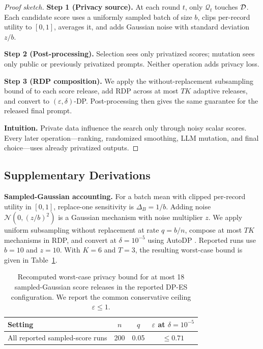 \begin{proof}[Proof sketch]
\textbf{Step 1 (Privacy source).} At each round $t$, only $\mathcal{Q}_t$ touches $\mathcal{D}$. Each candidate score uses a uniformly sampled batch of size $b$, clips per-record utility to $[0,1]$, averages it, and adds Gaussian noise with standard deviation $z/b$.

\noindent \textbf{Step 2 (Post-processing).} Selection sees only privatized scores; mutation sees only public or previously privatized prompts. Neither operation adds privacy loss.

\noindent \textbf{Step 3 (RDP composition).} We apply the without-replacement subsampling bound of \citet{wang2019subsampled} to each score release, add RDP across at most $TK$ adaptive releases, and convert to $(\varepsilon,\delta)$-DP. Post-processing then gives the same guarantee for the released final prompt.

\textbf{Intuition.} Private data influence the search only through noisy scalar scores. Every later operation---ranking, randomized smoothing, LLM mutation, and final choice---uses already privatized outputs.
\end{proof}

\subsection{Supplementary Derivations}
\label{sec:appendix:derivations}

\noindent\textbf{Sampled-Gaussian accounting.}
For a batch mean with clipped per-record utility in $[0,1]$, replace-one sensitivity is $\Delta_B=1/b$. Adding noise $\mathcal{N}(0,(z/b)^2)$ is a Gaussian mechanism with noise multiplier $z$. We apply uniform subsampling without replacement at rate $q=b/n$, compose at most $TK$ mechanisms in RDP, and convert at $\delta=10^{-5}$ using AutoDP \cite{autodp}. Reported runs use $b=10$ and $z=10$. With $K=6$ and $T=3$, the resulting worst-case bound is given in Table~\ref{tab:rdp_bounds}.

\begin{table}[t]
\centering
\small
\begin{tabular}{lccc}
\toprule
\textbf{Setting} & $n$ & $q$ & $\varepsilon$ at $\delta=10^{-5}$ \\
\midrule
All reported sampled-score runs & 200 & 0.05 & $\leq0.71$ \\
\bottomrule
\end{tabular}
\caption{Recomputed worst-case privacy bound for at most 18 sampled-Gaussian score releases in the reported DP-ES configuration. We report the common conservative ceiling $\varepsilon\leq1$.}
\label{tab:rdp_bounds}
\end{table}

